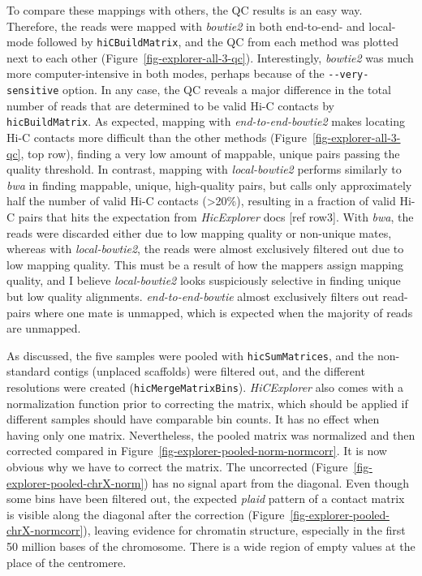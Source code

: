 \documentclass[
  11pt,
  a4paper,
]{scrbook}
\let\oldemph\emph
\renewcommand\emph[1]{\oldemph{\color{gray}#1}}
\begin{document}
To compare these mappings with others, the QC results is an easy way.
Therefore, the reads were mapped with \emph{bowtie2} in both end-to-end-
and local-mode followed by \texttt{hiCBuildMatrix}, and the QC from each
method was plotted next to each other
(Figure~\ref{fig-explorer-all-3-qc}). Interestingly, \emph{bowtie2} was
much more computer-intensive in both modes, perhaps because of the
\texttt{-\/-very-sensitive} option. In any case, the QC reveals a major
difference in the total number of reads that are determined to be valid
Hi-C contacts by \texttt{hicBuildMatrix}. As expected, mapping with
\emph{end-to-end-bowtie2} makes locating Hi-C contacts more difficult
than the other methods (Figure~\ref{fig-explorer-all-3-qc}, top row),
finding a very low amount of mappable, unique pairs passing the quality
threshold. In contrast, mapping with \emph{local-bowtie2} performs
similarly to \emph{bwa} in finding mappable, unique, high-quality pairs,
but calls only approximately half the number of valid Hi-C contacts
(\textgreater20\%), resulting in a fraction of valid Hi-C pairs that
hits the expectation from \emph{HicExplorer} docs {[}ref row3{]}. With
\emph{bwa}, the reads were discarded either due to low mapping quality
or non-unique mates, whereas with \emph{local-bowtie2}, the reads were
almost exclusively filtered out due to low mapping quality. This must be
a result of how the mappers assign mapping quality, and I believe
\emph{local-bowtie2} looks suspiciously selective in finding unique but
low quality alignments. \emph{end-to-end-bowtie} almost exclusively
filters out read-pairs where one mate is unmapped, which is expected
when the majority of reads are unmapped.

As discussed, the five samples were pooled with \texttt{hicSumMatrices},
and the non-standard contigs (unplaced scaffolds) were filtered out, and
the different resolutions were created (\texttt{hicMergeMatrixBins}).
\emph{HiCExplorer} also comes with a normalization function prior to
correcting the matrix, which should be applied if different samples
should have comparable bin counts. It has no effect when having only one
matrix. Nevertheless, the pooled matrix was normalized and then
corrected compared in Figure~\ref{fig-explorer-pooled-norm-normcorr}. It
is now obvious why we have to correct the matrix. The uncorrected
(Figure~\ref{fig-explorer-pooled-chrX-norm}) has no signal apart from
the diagonal. Even though some bins have been filtered out, the expected
\emph{plaid} pattern of a contact matrix is visible along the diagonal
after the correction (Figure~\ref{fig-explorer-pooled-chrX-normcorr}),
leaving evidence for chromatin structure, especially in the first 50
million bases of the chromosome. There is a wide region of empty values
at the place of the centromere.
\end{document}
